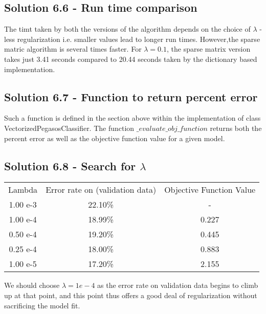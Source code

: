 \documentclass{article}
\begin{document}
    \subsection{Solution 6.6 - Run time comparison}
    The timt taken by both the versions of the algorithm depends on the choice of $\lambda$ - less regularization i.e. smaller values lead to longer run times. However,the sparse matric algorithm is several times faster. For $\lambda = 0.1$, the sparse matrix version takes just 3.41 seconds compared to 20.44 seconds taken by the dictionary based implementation.
    
    \subsection {Solution 6.7 - Function to return percent error}
    Such a function is defined in the section above within the implementation of class Vectorized\-Pegasos\-Classifier. The function $\_evaluate\_obj\_function$ returns both the percent error as well as the objective function value for a given model.
     
    \subsection{Solution 6.8 - Search for $\lambda$}
    \begin{center}
    \begin{tabular}{|c|c|c|}
    \hline
    Lambda & Error rate on (validation data) & Objective Function Value \\
    1.00 e-3 & 22.10\% & - \\
    1.00 e-4 & 18.99\% & 0.227 \\
    0.50 e-4 & 19.20\% & 0.445 \\
    0.25 e-4 & 18.00\% & 0.883 \\
    1.00 e-5 & 17.20\% & 2.155 \\
    \hline
    \end{tabular}
    \end{center}
        We should choose $\lambda = 1 e-4$ as the error rate on validation data begins to climb up at that point, and this point thus offers a good deal of regularization without sacrificing the model fit.
\end{document}
